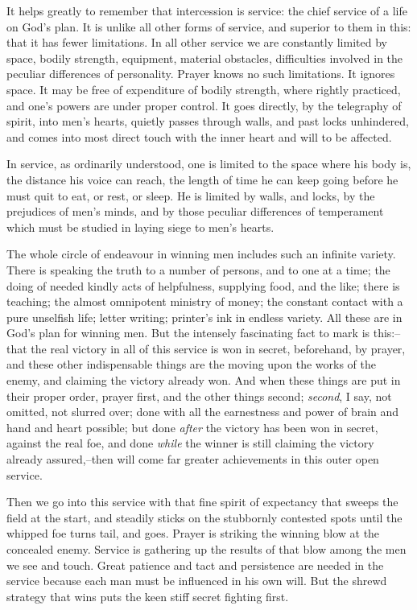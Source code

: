 It helps greatly to remember that intercession is service: the chief
service of a life on God's plan. It is unlike all other forms of service,
and superior to them in this: that it has fewer limitations. In all other
service we are constantly limited by space, bodily strength, equipment,
material obstacles, difficulties involved in the peculiar differences of
personality. Prayer knows no such limitations. It ignores space. It may be
free of expenditure of bodily strength, where rightly practiced, and one's
powers are under proper control. It goes directly, by the telegraphy of
spirit, into men's hearts, quietly passes through walls, and past locks
unhindered, and comes into most direct touch with the inner heart and will
to be affected.

In service, as ordinarily understood, one is limited to the space where
his body is, the distance his voice can reach, the length of time he can
keep going before he must quit to eat, or rest, or sleep. He is limited by
walls, and locks, by the prejudices of men's minds, and by those peculiar
differences of temperament which must be studied in laying siege to men's
hearts.

The whole circle of endeavour in winning men includes such an infinite
variety. There is speaking the truth to a number of persons, and to one at
a time; the doing of needed kindly acts of helpfulness, supplying food,
and the like; there is teaching; the almost omnipotent ministry of money;
the constant contact with a pure unselfish life; letter writing; printer's
ink in endless variety. All these are in God's plan for winning men. But
the intensely fascinating fact to mark is this:--that the real victory in
all of this service is won in secret, beforehand, by prayer, and these
other indispensable things are the moving upon the works of the enemy, and
claiming the victory already won. And when these things are put in their
proper order, prayer first, and the other things second; \textit{second}, I say,
not omitted, not slurred over; done with all the earnestness and power of
brain and hand and heart possible; but done \textit{after} the victory has been
won in secret, against the real foe, and done \textit{while} the winner is still
claiming the victory already assured,--then will come far greater
achievements in this outer open service.

Then we go into this service with that fine spirit of expectancy that
sweeps the field at the start, and steadily sticks on the stubbornly
contested spots until the whipped foe turns tail, and goes. Prayer is
striking the winning blow at the concealed enemy. Service is gathering up
the results of that blow among the men we see and touch. Great patience
and tact and persistence are needed in the service because each man must
be influenced in his own will. But the shrewd strategy that wins puts the
keen stiff secret fighting first.



